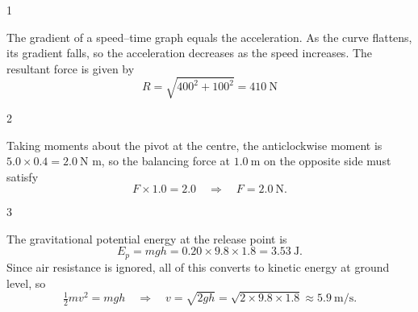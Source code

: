 \documentclass[11pt]{article}
\begin{document}
\subject{Physics}


\begin{question}{1}
\markscheme
{}
\endms

\exemplar
The gradient of a speed--time graph equals the acceleration. As the curve
flattens, its gradient falls, so the acceleration decreases as the speed
increases. The resultant force is given by
$$ R = \sqrt{400^{2} + 100^{2}} = 410\ \text{N} $$
\endexemplar
\end{question}

\begin{question}{2}
\markscheme
{}
\endms

\exemplar
Taking moments about the pivot at the centre, the anticlockwise moment
is $5.0 \times 0.4 = 2.0\ \text{N m}$, so the balancing force at
$1.0\ \text{m}$ on the opposite side must satisfy
$$ F \times 1.0 = 2.0 \quad \Rightarrow \quad F = 2.0\ \text{N}. $$
\endexemplar
\end{question}

\begin{question}{3}
\markscheme
{}
\endms

\exemplar
The gravitational potential energy at the release point is
$$ E_p = mgh = 0.20 \times 9.8 \times 1.8 = 3.53\ \text{J}. $$
Since air resistance is ignored, all of this converts to kinetic energy
at ground level, so
$$ \tfrac{1}{2}mv^{2} = mgh \quad\Rightarrow\quad v = \sqrt{2gh} = \sqrt{2 \times 9.8 \times 1.8} \approx 5.9\ \text{m/s}. $$
\endexemplar
\end{question}

\end{document}
